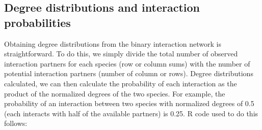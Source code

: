 \documentclass[12pt]{article}
\begin{document}


        



    \subsection*{Degree distributions and interaction probabilities}

      Obtaining degree distributions from the binary interaction 
      network is straightforward. To do this, we simply divide the 
      total number of observed interaction partners for each 
      species (row or column sums) with the number of potential 
      interaction partners (number of column or rows). Degree 
      distributions calculated, we can then calculate the 
      probability of each interaction as the product of the 
      normalized degrees of the two species. For example, the 
      probability of an interaction between two species with 
      normalized degrees of 0.5 (each interacts with half of the 
      available partners) is 0.25. R code used to do this follows:
\end{document}
